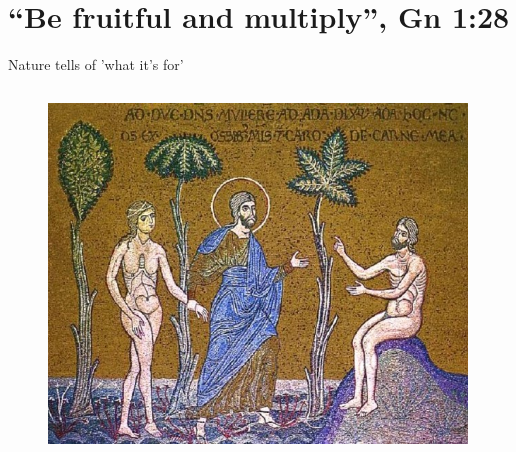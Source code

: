 \documentclass[xcolor=dvipsnames]{beamer}
\begin{document}
\section{``Be fruitful and multiply'', Gn 1:28}


\begin{frame}[fragile]{Nature tells of 'what it's for'}
  \begin{columns}[T] %
    \begin{column}{0.75\textwidth}
      \begin{figure}[H]
        \centering
        \includegraphics[width=0.99\textwidth]{fruitful}
      \end{figure}
    \end{column}%
  \end{columns}
\end{frame}
\end{document}
